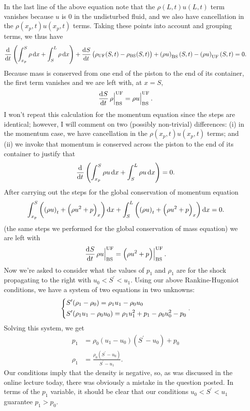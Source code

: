 \documentclass{article}
\newcommand{\bs}{\text{BS}}
\newcommand{\uf}{\text{UF}}
\begin{document}
%
In the last line of the above equation note that the $\rho(L, t) u(L,
t)$ term vanishes because $u$ is $0$ in the undisturbed fluid, and we
also have cancellation in the $\rho(x_p, t) u(x_p, t)$ terms. Taking
these points into account and grouping terms, we thus have
%
\begin{equation*}
    \dod{}{t} \del{
        \int_{x_p}^S \rho \dif x
        + \int_S^L \rho \dif x
    }
    + \dod{S}{t} \del{\rho_\uf(S, t) - \rho_\bs(S, t)}
    + \del{\rho u}_\bs(S, t) - \del{\rho u}_\uf(S, t) = 0
    .
\end{equation*}
%
Because mass is conserved from one end of the piston to the end of its
container, the first term vanishes and we are left with, at $x = S$,
%
\begin{equation*}
    \dod{S}{t} \eval[2]{\rho}_\bs^\uf = \eval[2]{\rho u}_\bs^\uf
    .
\end{equation*}
%
I won't repeat this calculation for the momentum equation since the
steps are identical; however, I will comment on two (possibly
non-trivial) differences: (i) in the momentum case, we have cancellation
in the $\rho(x_p, t) u(x_p, t)$ terms; and (ii) we invoke that momentum
is conserved across the piston to the end of its container to justify
that
%
\begin{equation*}
    \dod{}{t} \del{
        \int_{x_p}^S \rho u \dif x
        + \int_S^L \rho u \dif x
    } = 0
    .
\end{equation*}
%
After carrying out the steps for the global conservation of momentum equation
%
%
\begin{equation*}
    \int_{x_p}^S \del{\del{\rho u}_t + \del{\rho u^2 + p}_x} \dif x
        + \int_S^L \del{\del{\rho u}_t + \del{\rho u^2 + p}_x} \dif x
        = 0
        .
\end{equation*}
%
(the same steps we performed for the global conservation of mass
equation) we are left with
%
\begin{equation*}
    \dod{S}{t} \eval[2]{\rho u }_\bs^\uf = \eval[2]{\del{\rho u^2 + p}}_\bs^\uf
    .
\end{equation*}
%
Now we're asked to consider what the values of $p_1$ and $\rho_1$ are
for the shock propagating to the right with $u_0 < S^\prime < u_1$.
Using our above Rankine-Hugoniot conditions, we have a system of two
equations in two unknowns:
%
\begin{equation*}
    \begin{dcases}
        S^\prime (\rho_1 - \rho_0) = \rho_1 u_1 - \rho_0 u_0 \\
        S^\prime (\rho_1 u_1 - \rho_0 u_0) = \rho_1 u_1^2 + p_1 - \rho_0 u_0^2 - p_0
    \end{dcases}
    .
\end{equation*}
%
Solving this system, we get
%
\begin{align*}
    p_1 &= \rho_0 (u_1 - u_0) (S^\prime - u_0) + p_0 \\
    \rho_1 &= \frac{\rho_0 (S^\prime - u_0)}{S^\prime - u_1}
    .
\end{align*}
%
Our conditions imply that the density is negative, so, as was discussed
in the online lecture today, there was obviously a mistake in the
question posted. In terms of the $p_1$ variable, it should be clear that
our conditions $u_0 < S^\prime < u_1$ guarantee $p_1 > p_0$.
\end{document}
